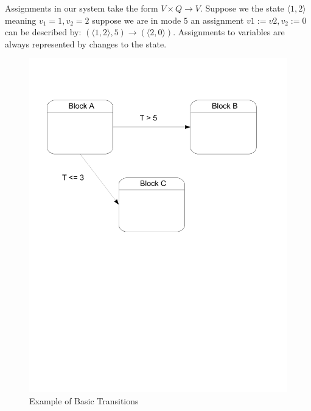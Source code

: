 Assignments in our system take the form $V \times Q \rightarrow V$. Suppose we the state $\langle 1,2 \rangle$ meaning $v_1 = 1, v_2 = 2$ suppose we are in mode $5$ an assignment $v1 := v2, v_2 := 0$ can be described by: $( \langle 1,2 \rangle,5) \rightarrow ( \langle 2,0 \rangle )$. Assignments to variables are always represented by changes to the state.

\begin{figure}[htp]
    \centering
    \includegraphics[trim= 10mm 130mm 20mm 10mm, clip, width=\imgmedphoto]{./images/state_transition.pdf}
    \caption{Example of Basic Transitions}
    \label{fig:state_transition_cor}
\end{figure}

